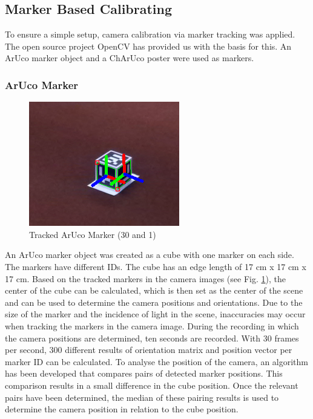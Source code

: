 \documentclass[conference]{IEEEtran}
\begin{document}
\subsection{Marker Based Calibrating}
To ensure a simple setup, camera calibration via marker tracking was applied. The open source project OpenCV has provided us with the basis for this. An ArUco marker object and a ChArUco poster were used as markers.
\subsubsection{ArUco Marker}
\begin{figure}[h]
    \centering
    \includegraphics[width=1.0\linewidth]{Pictures/TrackedMarkers.png}
    \caption{Tracked ArUco Marker (30 and 1)}
    \label{Tracked ArUco Marker (30 and 1)}
\end{figure}
An ArUco marker object was created as a cube with one marker on each side. The markers have different IDs. The cube has an edge length of 17 cm x 17 cm x 17 cm. Based on the tracked markers in the camera images (see Fig. \ref{Tracked ArUco Marker (30 and 1)}), the center of the cube can be calculated, which is then set as the center of the scene and can be used to determine the camera positions and orientations. Due to the size of the marker and the incidence of light in the scene, inaccuracies may occur when tracking the markers in the camera image. During the recording in which the camera positions are determined, ten seconds are recorded. With 30 frames per second, 300 different results of orientation matrix and position vector per marker ID can be calculated. To analyse the position of the camera, an algorithm has been developed that compares pairs of detected marker positions. This comparison results in a small difference in the cube position. Once the relevant pairs have been determined, the median of these pairing results is used to determine the camera position in relation to the cube position.
\end{document}
